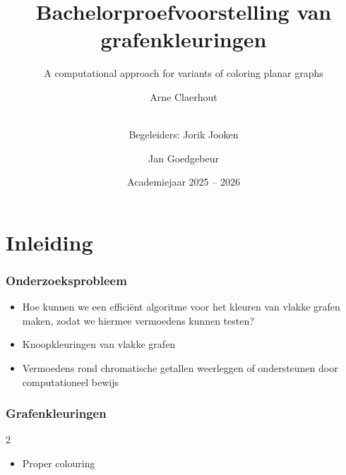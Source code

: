 \documentclass
[kulak] %
{kulakbeamer}
\title[Bachelorproef]{Bachelorproefvoorstelling van grafenkleuringen}
\subtitle{A computational approach for variants of coloring planar graphs}
\author{Arne Claerhout \and \\
Begeleiders: Jorik Jooken \and Jan Goedgebeur}
\institute[Kulak]{KU Leuven Kulak}
\date{Academiejaar 2025 -- 2026}
\begin{document}
	
	\begin{titleframe}
		\titlepage
	\end{titleframe}
	
	\begin{outlineframe}[Overzicht]
		\tableofcontents
	\end{outlineframe}
	
	
	\section{Inleiding}
	
	\begin{frame}
		\frametitle{Onderzoeksprobleem}
		
		\begin{itemize}
			\item Hoe kunnen we een efficiënt algoritme voor het kleuren van vlakke grafen maken, zodat we hiermee vermoedens kunnen testen?
			\item Knoopkleuringen van vlakke grafen
			\item Vermoedens rond chromatische getallen weerleggen of ondersteunen door computationeel bewijs
		\end{itemize}
	\end{frame}
	
	\begin{frame}
		\frametitle{Grafenkleuringen}
		
		\begin{multicols}{2}

			\begin{itemize}
				\item Proper colouring
			\end{itemize}
			
			\vspace*{\fill}\null
			
			\pause
			
			
		\end{multicols}
		
	\end{frame}
	
\end{document}
